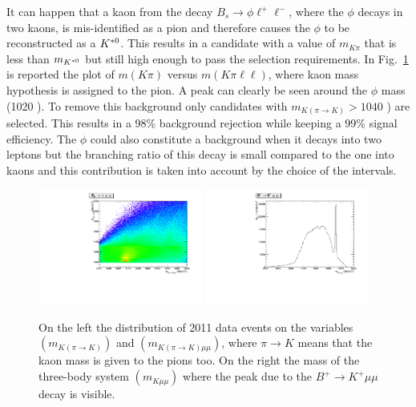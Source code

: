 It can happen that a kaon from the decay $B_s \rightarrow \phi \ell^+\ell^-$, where the $\phi$ decays in two kaons,
is mis-identified as a pion and therefore causes the $\phi$ to be reconstructed as a ${{K}^{*0}}$. This results in
a candidate with a value of $m_{K\pi}$ that is less than $m_{{{K}^{*0}}}$ but still high enough to
pass the selection requirements. In Fig.~\ref{fig:phiplots} is reported the plot of $m(K\pi)$ versus
$m(K\pi \ell\ell)$, where kaon mass hypothesis is assigned to the pion. A peak can clearly be seen
around the $\phi$ mass (1020 \mevcc).
To remove this background only candidates with $m_{K(\pi\rightarrow K)} > 1040$ \mevcc) are selected.
This results in a 98\% background rejection while keeping a 99\% signal efficiency.
The $\phi$ could also constitute a background when it decays into two leptons but the
branching ratio of this decay is small compared to the one into kaons and this
contribution is taken into account by the choice of the \qsq intervals.

\begin{center}
\begin{figure}[h!]
\centering 
\includegraphics[width=0.48\textwidth]{RKst/figs/RKst/phi.pdf}
\includegraphics[width=0.48\textwidth]{RKst/figs/RKst/Kmumu.pdf}
\caption{ On the left the distribution of 2011 data events on the variables $(m_{K(\pi\rightarrow K)})$ 
and $(m_{K(\pi\rightarrow K)\mu\mu})$, where $\pi\rightarrow K$ means that the kaon mass is given 
to the pions too. On the right the mass of the three-body system $(m_{K\mu\mu})$
where the peak due to the $B^+ \rightarrow K^+ \mu\mu$ decay is visible. }
\label{fig:phiplots}
\end{figure}
\end{center}


